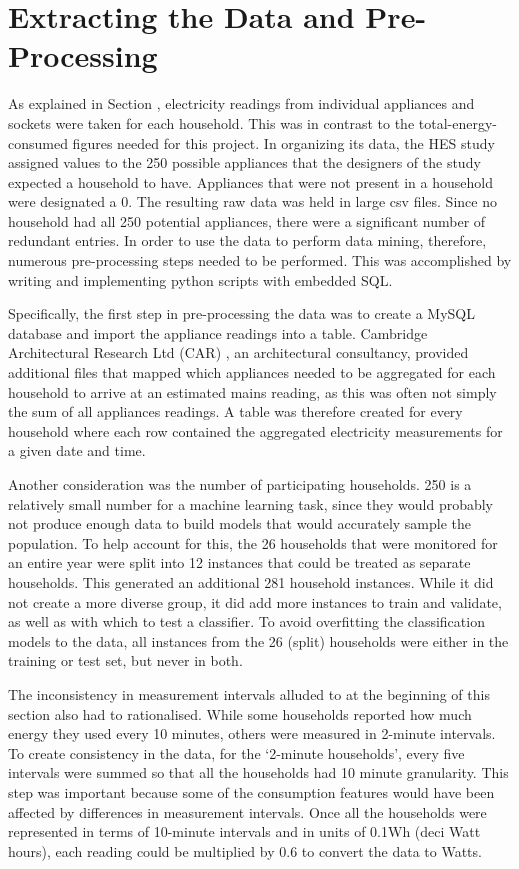 \section{Extracting the Data and Pre-Processing}

As explained in Section \mentionOfAggregationSection, electricity readings from individual appliances and sockets were taken for each household.  This was in contrast to the total-energy-consumed figures needed for this project. In organizing its data, the HES study assigned values to the 250 possible appliances that the designers of the study expected a household to have.  Appliances that were not present in a household were designated a 0.  The resulting raw data was held in large csv files.  Since no household had all 250 potential appliances, there were a significant number of redundant entries. In order to use the data to perform data mining, therefore, numerous pre-processing steps needed to be performed.  This was accomplished by writing and implementing python scripts with embedded SQL.

Specifically, the first step in pre-processing the data was to create a MySQL database and import the appliance readings into a table. Cambridge Architectural Research Ltd (CAR) \cite{CARG_1} , an architectural consultancy, provided additional files that mapped which appliances needed to be aggregated for each household to arrive at an estimated mains reading, as this was often not simply the sum of all appliances readings. A table was therefore created for every household where each row contained the aggregated electricity measurements for a given date and time. 

Another consideration was the number of participating households.  250 is a relatively small number for a machine learning task, since they would probably not produce enough data to build models that would  accurately sample the population. To help account for this, the 26 households that were monitored for an entire year were split into 12 instances that could be treated as separate households.  This generated an additional 281 household instances. While it did not create a more diverse group, it did add more instances to train and validate, as well as with which to test a classifier. To avoid overfitting the classification models to the data, all instances from the 26 (split) households were either in the training or test set, but never in both.

The inconsistency in measurement intervals alluded to at the beginning of this section also had to rationalised. While some households reported how much energy they used every 10 minutes, others were measured in 2-minute intervals. To create consistency in the data, for the `2-minute households', every five intervals were summed so that all the households had 10 minute granularity. This step was important because some of the consumption features would have been affected by differences in measurement intervals. Once all the households were represented in terms of 10-minute intervals and in units of 0.1Wh (deci Watt hours), each reading could be multiplied by 0.6 to convert the data to Watts.

